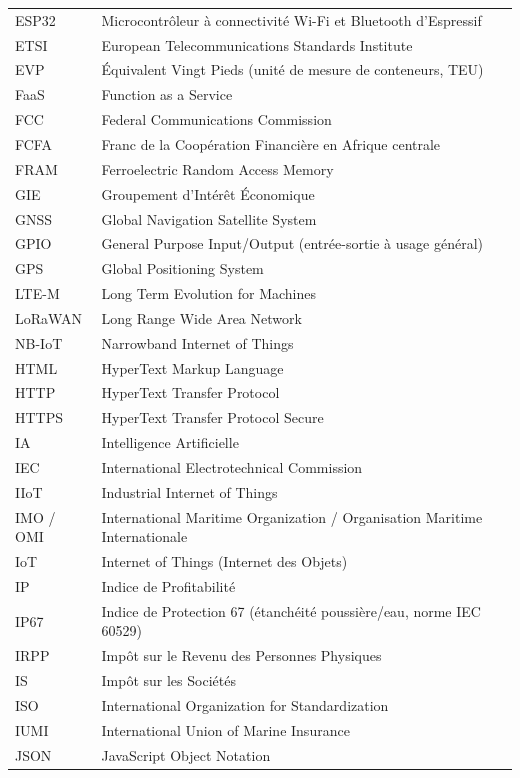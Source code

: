 \begin{longtable}{@{}p{3.2cm}p{11.4cm}@{}}
	ESP32 & Microcontrôleur à connectivité Wi-Fi et Bluetooth d'Espressif \\
	ETSI & European Telecommunications Standards Institute \\
	EVP & Équivalent Vingt Pieds (unité de mesure de conteneurs, TEU) \\
	FaaS & Function as a Service \\
	FCC & Federal Communications Commission \\
	FCFA & Franc de la Coopération Financière en Afrique centrale \\
	FRAM & Ferroelectric Random Access Memory \\
	GIE & Groupement d'Intérêt Économique \\
	GNSS & Global Navigation Satellite System \\
	GPIO & General Purpose Input/Output (entrée-sortie à usage général) \\
	GPS & Global Positioning System \\
	LTE-M & Long Term Evolution for Machines \\
	LoRaWAN & Long Range Wide Area Network \\
	NB-IoT & Narrowband Internet of Things \\
	HTML & HyperText Markup Language \\
	HTTP & HyperText Transfer Protocol \\
	HTTPS & HyperText Transfer Protocol Secure \\
	IA & Intelligence Artificielle \\
	IEC & International Electrotechnical Commission \\
	IIoT & Industrial Internet of Things \\
	IMO / OMI & International Maritime Organization / Organisation Maritime Internationale \\
	IoT & Internet of Things (Internet des Objets) \\
	IP & Indice de Profitabilité \\
	IP67 & Indice de Protection 67 (étanchéité poussière/eau, norme IEC 60529) \\
	IRPP & Impôt sur le Revenu des Personnes Physiques \\
	IS & Impôt sur les Sociétés \\
	ISO & International Organization for Standardization \\
	IUMI & International Union of Marine Insurance \\
	JSON & JavaScript Object Notation \\

\end{longtable}
